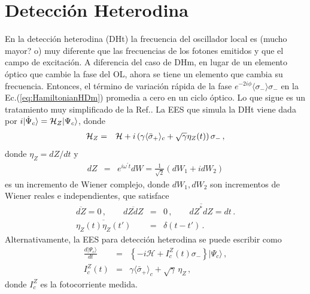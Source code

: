 \documentclass[twocolumn,aps,eqsecnum,showkeys,amsmath]{revtex4}
\newcommand{\mcH}{\mathcal{H}} 	%
\providecommand{\vxp}[1]{\langle #1 \rangle}
\providecommand{\ket}[1]{\lvert #1 \rangle}
\begin{document}

\section{Detecci\'on Heterodina }
En la detecci\'on heterodina (DHt) la frecuencia del oscillador local es 
(mucho mayor? o) muy diferente que las frecuencias de los fotones 
emitidos y que el campo de excitaci\'on. A diferencia del caso de DHm, 
en lugar de un elemento \'optico que cambie la fase del OL, ahora se 
tiene un elemento que cambia su frecuencia. Entonces, el t\'ermino de 
variaci\'on r\'apida de la fase $e^{-2i\phi} \vxp{\sigma_-} \sigma_-$ en 
la Ec.(\ref{eq:HamiltonianHDm}) promedia a cero en un ciclo \'optico. 
Lo que sigue es un tratamiento muy simplificado de la Ref.\cite{WiMi93b}.
La EES que simula la DHt viene dada por 
$i \ket{\dot{\Psi}_c} ={\cal H}_Z \ket{\Psi_c}$, donde  
%
\begin{eqnarray} 	%
{\cal H}_Z &=& {\cal H} +i\left(\gamma \vxp{\bar{\sigma}_+}_c 
	+\sqrt{\gamma}  \eta_Z(t) \right) \sigma_- \,, 
\end{eqnarray}
donde $\eta_Z=dZ/dt$ y  
%
\begin{eqnarray}
dZ &=& e^{i\omega^{\prime} t} dW =\frac{1}{\sqrt{2}} (dW_1 +idW_2)
\end{eqnarray}
es un incremento de Wiener complejo, donde $dW_1, dW_2$ son 
incrementos de Wiener reales e independientes, que satisface
%
\begin{eqnarray} 	\label{eq:ComplexGaussNoise}
\overline{dZ} = 0 \,, \qquad \overline{dZdZ} &=&0  \,, 
	\qquad \overline{dZ^\ast dZ} =dt \,. 	\nonumber \\
	\overline{\eta_Z(t) \eta_Z(t')} &=& \delta(t-t') \,. 
\end{eqnarray}
Alternativamente, la EES para detecci\'on heterodina se puede 
escribir como   
% 
\begin{subequations}
\begin{eqnarray}
\frac{d \ket{\Psi_c}}{dt} 
	&=& \left\{ -i \mcH   +I_c^Z(t) \sigma_- \right\}  \ket{\Psi_c}  \,, \\
I_c^Z(t) &=& \gamma  \vxp{\bar{\sigma}_+}_c   
	+\sqrt{\gamma} \, \eta_Z	\,,	\label{HeterodyneSSE}
\end{eqnarray}
\end{subequations}
donde $I_c^Z$ es la fotocorriente medida. 
\end{document}
